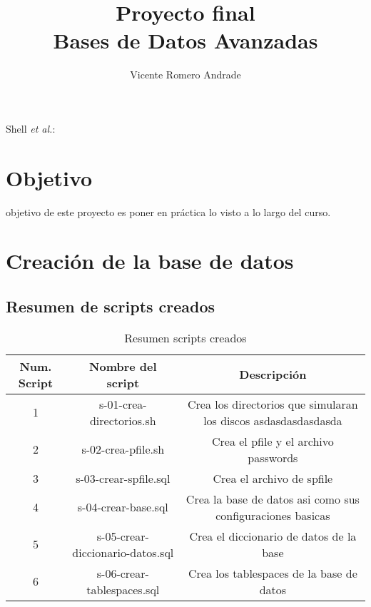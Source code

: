 \documentclass[journal]{IEEEtran}
\begin{document}
\onecolumn
\title{Proyecto final \\ Bases de Datos Avanzadas}
%
\author{Vicente Romero Andrade}

%
{Shell \MakeLowercase{\textit{et al.}}: }

\maketitle



\section{Objetivo}

 objetivo de este proyecto es poner en práctica lo visto a lo largo 
del curso.

\section{Creación de la base de datos}
\subsection{Resumen de scripts creados}
\begin{table}[H]
  \centering
  \begin{longtable}{|c | c | c|} 
   \hline
   Num. Script & Nombre del script & Descripción \\ [0.5ex] 
   \hline
   1 & s-01-crea-directorios.sh & Crea los directorios que simularan los discos asdasdasdasdasda\\ 
   \hline
   2 & s-02-crea-pfile.sh & Crea el pfile y el archivo passwords \\
   \hline
   3 & s-03-crear-spfile.sql & Crea el archivo de spfile  \\
   \hline
   4 & s-04-crear-base.sql & Crea la base de datos asi como sus configuraciones basicas \\
   \hline
   5 & s-05-crear-diccionario-datos.sql & Crea el diccionario de datos de la base \\
   \hline
   6 & s-06-crear-tablespaces.sql & Crea los tablespaces de la base de datos \\
   \hline
  \end{longtable}
  \caption{Resumen scripts creados}
  \label{tabla:1}
\end{table}
\end{document}
